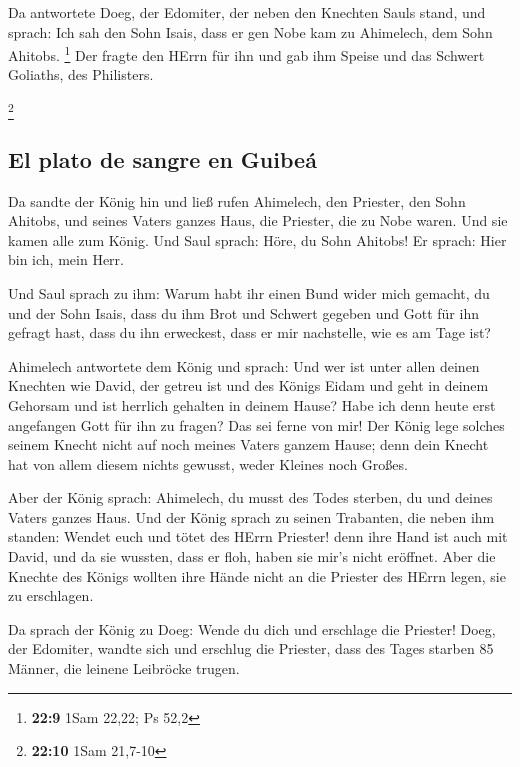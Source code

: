  Da antwortete Doeg, der Edomiter, der neben den Knechten
Sauls stand, und sprach: Ich sah den Sohn Isais, dass er gen Nobe kam zu
Ahimelech, dem Sohn Ahitobs. \footnote{\textbf{22:9} 1Sam 22,22; Ps 52,2}
 Der fragte den HErrn für ihn und gab ihm Speise und das
Schwert Goliaths, des Philisters.

\footnote{\textbf{22:10} 1Sam 21,7-10}

\hypertarget{el-plato-de-sangre-en-guibeuxe1}{%
\subsection{El plato de sangre en
Guibeá}\label{el-plato-de-sangre-en-guibeuxe1}}

 Da sandte der König hin und ließ rufen Ahimelech, den
Priester, den Sohn Ahitobs, und seines Vaters ganzes Haus, die Priester,
die zu Nobe waren. Und sie kamen alle zum König.  Und
Saul sprach: Höre, du Sohn Ahitobs! Er sprach: Hier bin ich, mein Herr.

 Und Saul sprach zu ihm: Warum habt ihr einen Bund wider
mich gemacht, du und der Sohn Isais, dass du ihm Brot und Schwert
gegeben und Gott für ihn gefragt hast, dass du ihn erweckest, dass er
mir nachstelle, wie es am Tage ist?

 Ahimelech antwortete dem König und sprach: Und wer ist
unter allen deinen Knechten wie David, der getreu ist und des Königs
Eidam und geht in deinem Gehorsam und ist herrlich gehalten in deinem
Hause?  Habe ich denn heute erst angefangen Gott für ihn
zu fragen? Das sei ferne von mir! Der König lege solches seinem Knecht
nicht auf noch meines Vaters ganzem Hause; denn dein Knecht hat von
allem diesem nichts gewusst, weder Kleines noch Großes.

 Aber der König sprach: Ahimelech, du musst des Todes
sterben, du und deines Vaters ganzes Haus.  Und der König
sprach zu seinen Trabanten, die neben ihm standen: Wendet euch und tötet
des HErrn Priester! denn ihre Hand ist auch mit David, und da sie
wussten, dass er floh, haben sie mir's nicht eröffnet. Aber die Knechte
des Königs wollten ihre Hände nicht an die Priester des HErrn legen, sie
zu erschlagen.

 Da sprach der König zu Doeg: Wende du dich und erschlage
die Priester! Doeg, der Edomiter, wandte sich und erschlug die Priester,
dass des Tages starben 85 Männer, die leinene Leibröcke trugen.

